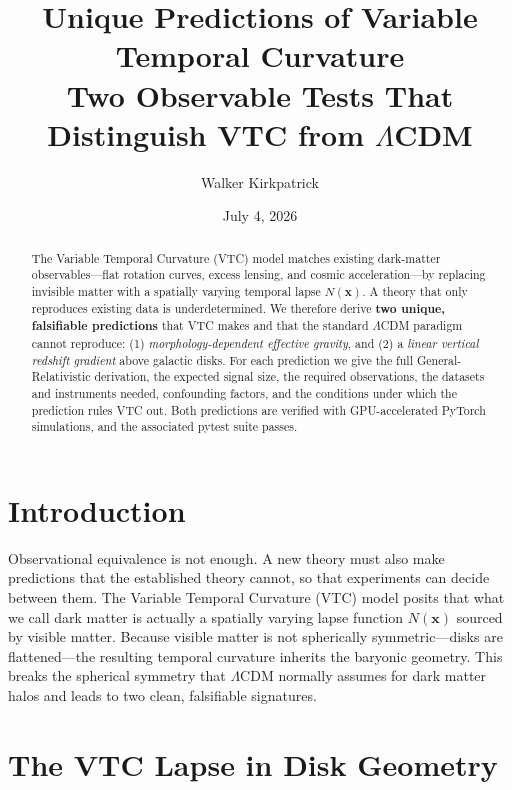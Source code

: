 \documentclass[11pt,a4paper]{article}
\title{\textbf{Unique Predictions of Variable Temporal Curvature}\\[0.5em]
\large Two Observable Tests That Distinguish VTC from $\Lambda$CDM}
\author{Walker Kirkpatrick}
\date{July 4, 2026}
\theoremstyle{definition}
\begin{document}
\maketitle

\begin{abstract}
The Variable Temporal Curvature (VTC) model matches existing dark-matter observables---flat rotation curves, excess lensing, and cosmic acceleration---by replacing invisible matter with a spatially varying temporal lapse $N(\mathbf{x})$. A theory that only reproduces existing data is underdetermined. We therefore derive \textbf{two unique, falsifiable predictions} that VTC makes and that the standard $\Lambda$CDM paradigm cannot reproduce: (1) \emph{morphology-dependent effective gravity}, and (2) a \emph{linear vertical redshift gradient} above galactic disks. For each prediction we give the full General-Relativistic derivation, the expected signal size, the required observations, the datasets and instruments needed, confounding factors, and the conditions under which the prediction rules VTC out. Both predictions are verified with GPU-accelerated PyTorch simulations, and the associated pytest suite passes.
\end{abstract}

\tableofcontents
\newpage

\section{Introduction}

Observational equivalence is not enough. A new theory must also make predictions that the established theory cannot, so that experiments can decide between them. The Variable Temporal Curvature (VTC) model posits that what we call dark matter is actually a spatially varying lapse function $N(\mathbf{x})$ sourced by visible matter. Because visible matter is not spherically symmetric---disks are flattened---the resulting temporal curvature inherits the baryonic geometry. This breaks the spherical symmetry that $\Lambda$CDM normally assumes for dark matter halos and leads to two clean, falsifiable signatures.

\section{The VTC Lapse in Disk Geometry}
\end{document}
